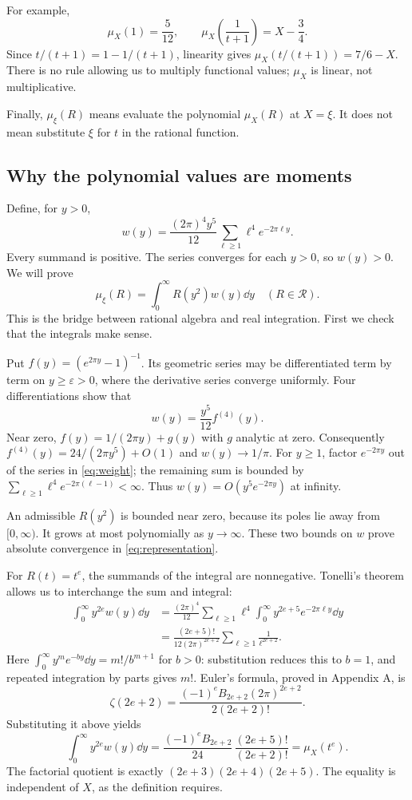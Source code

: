 For example,
\[
 \mu_X(1)=\frac5{12},\qquad
 \mu_X\!\left(\frac1{t+1}\right)=X-\frac34.
\]
Since $t/(t+1)=1-1/(t+1)$, linearity gives
$\mu_X(t/(t+1))=7/6-X$. There is no rule allowing us to multiply
functional values; $\mu_X$ is linear, not multiplicative.

Finally, $\mu_\xi(R)$ means evaluate the polynomial $\mu_X(R)$ at $X=\xi$.
It does not mean substitute $\xi$ for $t$ in the rational function.

\subsection{Why the polynomial values are moments}
Define, for $y>0$,
\begin{equation}\label{eq:weight}
 w(y)=\frac{(2\pi)^4y^5}{12}
       \sum_{\ell\geq1}\ell^4e^{-2\pi\ell y}.
\end{equation}
Every summand is positive. The series converges for each $y>0$, so
$w(y)>0$. We will prove
\begin{equation}\label{eq:representation}
 \boxed{\mu_\xi(R)=\int_0^\infty R(y^2)w(y)\dd y
        \quad(R\in\mathcal R).}
\end{equation}
This is the bridge between rational algebra and real integration.
First we check that the integrals make sense.

Put $f(y)=(e^{2\pi y}-1)^{-1}$. Its geometric series may be differentiated
term by term on $y\geq\varepsilon>0$, where the derivative series converge
uniformly. Four differentiations show that
\[
 w(y)=\frac{y^5}{12}f^{(4)}(y).
\]
Near zero, $f(y)=1/(2\pi y)+g(y)$ with $g$ analytic at zero. Consequently
$f^{(4)}(y)=24/(2\pi y^5)+O(1)$ and $w(y)\to1/\pi$.
For $y\geq1$, factor $e^{-2\pi y}$ out of the series in \eqref{eq:weight};
the remaining sum is bounded by
$\sum_{\ell\geq1}\ell^4e^{-2\pi(\ell-1)}<\infty$.
Thus $w(y)=O(y^5e^{-2\pi y})$ at infinity.

An admissible $R(y^2)$ is bounded near zero, because its poles lie away from
$[0,\infty)$. It grows at most polynomially as $y\to\infty$.
These two bounds on $w$ prove absolute convergence in
\eqref{eq:representation}.

For $R(t)=t^e$, the summands of the integral are nonnegative. Tonelli's
theorem allows us to interchange the sum and integral:
\begin{align*}
 \int_0^\infty y^{2e}w(y)\dd y
 &=\frac{(2\pi)^4}{12}\sum_{\ell\geq1}\ell^4
      \int_0^\infty y^{2e+5}e^{-2\pi\ell y}\dd y\\
 &=\frac{(2e+5)!}{12(2\pi)^{2e+2}}
      \sum_{\ell\geq1}\frac1{\ell^{2e+2}}.
\end{align*}
Here $\int_0^\infty y^m e^{-by}\dd y=m!/b^{m+1}$ for $b>0$:
substitution reduces this to $b=1$, and repeated integration by parts gives
$m!$. Euler's formula, proved in Appendix A, is
\[
 \zeta(2e+2)=
 \frac{(-1)^eB_{2e+2}(2\pi)^{2e+2}}{2(2e+2)!}.
\]
Substituting it above yields
\[
 \int_0^\infty y^{2e}w(y)\dd y
 =\frac{(-1)^eB_{2e+2}}{24}\,
       \frac{(2e+5)!}{(2e+2)!}
 =\mu_X(t^e).
\]
The factorial quotient is exactly $(2e+3)(2e+4)(2e+5)$.
The equality is independent of $X$, as the definition requires.

